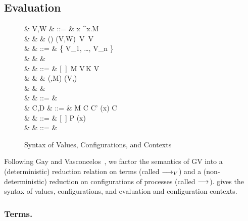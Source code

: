 \documentclass[oribibl,orivec,envcountsame]{llncs}
\begin{document}
\subsection{Evaluation}\label{sec:gv-eval}

\begin{figure}[float]
\begin{syntax}
   & V,W & ::= & x \mid \lambda^\sigma x.M \\
  & & \mid & () \mid (V,W) \mid {}\,V \mid {}\,V  \\
   & \sigma & ::= & \{  {V_1}, \dots,  {V_n} \} \\
  & & & \qquad{} \\
   & \Ex & ::= &  [~] \mid \Ex\,M \mid V\,\Ex \mid K \app V \mid {} \\
  & & \mid & (\Ex,M) \mid (V,\Ex) \mid {} \\
  & & \mid & \,\Ex \mid {}\,\Ex \mid {} \\
  & \Fx & ::= & \phi \Ex \\
   & C,D & ::= & \phi M \mid C \parallel C' \mid (\nu x) C \\
   & \Cx & ::= & [~] \mid \Cx \parallel P \mid (\nu x)\Cx \\
   & \phi & ::= & \wcirc \mid \bcirc
\end{syntax}
\caption{Syntax of Values, Configurations, and Contexts}\label{fig:gv-eval-syntax}
\end{figure}

Following Gay and Vasconcelos~\cite{GayVasconcelos10}, we factor the semantics of GV into a
(deterministic) reduction relation on terms (called $\longrightarrow_V$) and a (non-deterministic) reduction on
configurations of processes (called $\longrightarrow$).   gives the syntax of values,
configurations, and evaluation and configuration contexts.

\subsubsection{Terms.}
\end{document}
